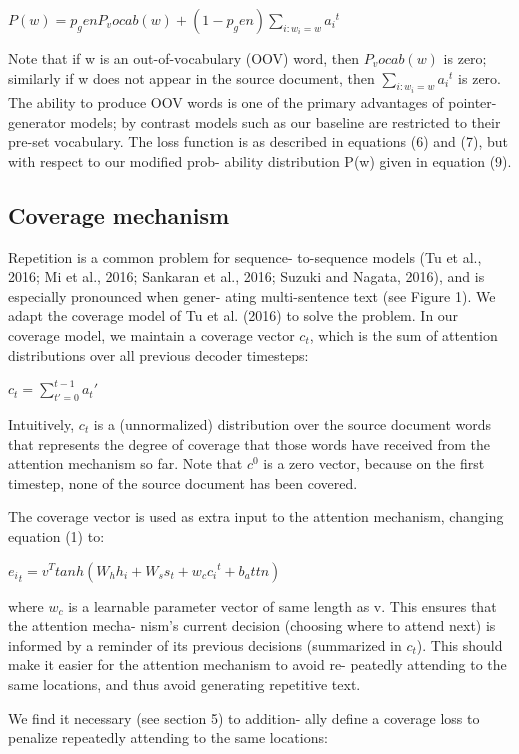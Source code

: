 \documentclass[UTF8]{ctexart}
\begin{document}
$    P(w)=p_gen P_vocab(w) +(1-p_gen)\sum_{i:w_i=w}{a_i}^t $


Note that if w is an out-of-vocabulary (OOV)
word, then $P_vocab(w)$ is zero; similarly if w does
not appear in the source document, then $\sum_{i:w_i=w}{a_i}^t$
is zero. The ability to produce OOV words is
one of the primary advantages of pointer-generator
models; by contrast models such as our baseline
are restricted to their pre-set vocabulary.
The loss function is as described in equations
(6) and (7), but with respect to our modified prob-
ability distribution P(w) given in equation (9).


   \subsection{Coverage mechanism}

   Repetition is a common problem for sequence-
to-sequence models (Tu et al., 2016; Mi et al.,
2016; Sankaran et al., 2016; Suzuki and Nagata,
2016), and is especially pronounced when gener-
ating multi-sentence text (see Figure 1). We adapt
the coverage model of Tu et al. (2016) to solve the
problem. In our coverage model, we maintain a
coverage vector $c_t$, which is the sum of attention
distributions over all previous decoder timesteps:

$             c_t=\sum_{t'=0}^{t-1} a_t'    $

Intuitively, $c_t$ is a (unnormalized) distribution over
the source document words that represents the degree of coverage that those words have received
from the attention mechanism so far. Note that $c^0$
is a zero vector, because on the first timestep, none
of the source document has been covered.

The coverage vector is used as extra input to the
attention mechanism, changing equation (1) to:

$  {e_i}_t=v^Ttanh(W_h h_i+ W_s s_t +w_c {c_i}^t +b_attn )$

where $w_c$ is a learnable parameter vector of same
length as v. This ensures that the attention mecha-
nism’s current decision (choosing where to attend
next) is informed by a reminder of its previous
decisions (summarized in $c_t$). This should make
it easier for the attention mechanism to avoid re-
peatedly attending to the same locations, and thus
avoid generating repetitive text.

We find it necessary (see section 5) to addition-
ally define a coverage loss to penalize repeatedly
attending to the same locations:
\end{document}

